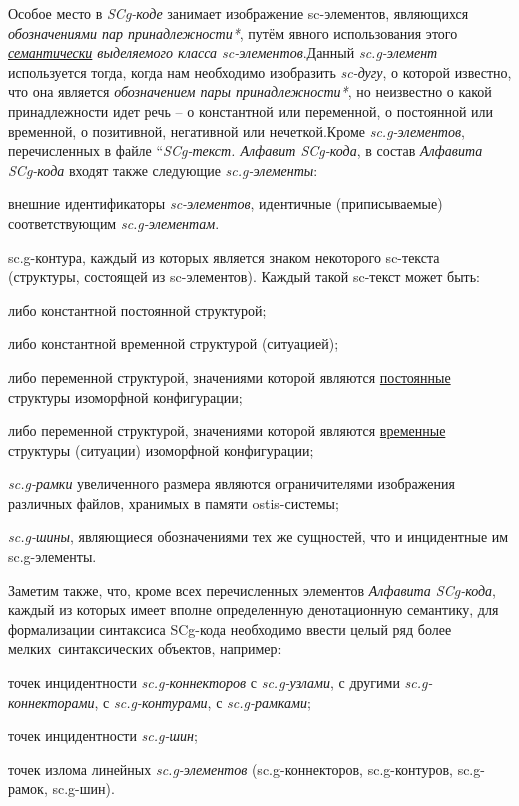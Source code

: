 \begin{SCn}
\begin{scnstruct}
\begin{scnsubstruct}
{            Особое место в \textit{SCg-коде} занимает изображение sc-элементов, являющихся \textit{обозначениями пар принадлежности*}, путём явного использования этого \textit{\uline{семантически} выделяемого класса sc-элементов}.Данный \textit{sc.g-элемент} используется тогда, когда нам необходимо изобразить \textit{sc-дугу}, о которой известно, что она является \textit{обозначением пары принадлежности*}, но неизвестно о какой принадлежности идет речь -- о константной или переменной, о постоянной или временной, о позитивной, негативной или нечеткой.Кроме\textit{ sc.g-элементов}, перечисленных в файле ``\textit{SCg-текст. Алфавит SCg-кода}, в состав \textit{Алфавита SCg-кода} входят также следующие \textit{sc.g-элементы}:\begin{scnitemize}
            \item{внешние идентификаторы \textit{sc-элементов}, идентичные (приписываемые) соответствующим \textit{sc.g-элементам}.}\item{sc.g-контура, каждый из которых является знаком некоторого sc-текста (структуры, состоящей из sc-элементов). Каждый такой sc-текст может быть:}\begin{scnitemizeii}
            \item{либо константной постоянной структурой;}\item{либо константной временной структурой (ситуацией);}\item{либо переменной структурой, значениями которой являются \uline{постоянные} структуры изоморфной  конфигурации;}\item{либо переменной структурой, значениями которой являются \uline{временные} структуры (ситуации) изоморфной  конфигурации;}\end{scnitemizeii}
            \item{\textit{sc.g-рамки} увеличенного размера являются ограничителями изображения различных файлов, хранимых в памяти ostis-системы;}\item{\textit{sc.g-шины}, являющиеся обозначениями тех же сущностей, что и инцидентные им sc.g-элементы.}\end{scnitemize}
            Заметим также, что, кроме всех перечисленных элементов \textit{Алфавита SCg-кода}, каждый из которых имеет вполне определенную денотационную  семантику, для формализации синтаксиса SCg-кода необходимо ввести целый ряд более мелких\ синтаксических объектов, например:\begin{scnitemize}
            \item{точек инцидентности \textit{sc.g-коннекторов} с \textit{sc.g-узлами}, с другими \textit{sc.g-коннекторами}, с \textit{sc.g-контурами}, с \textit{sc.g-рамками};}\item{точек инцидентности \textit{sc.g-шин};}\item{точек излома линейных \textit{sc.g-элементов} (sc.g-коннекторов, sc.g-контуров, sc.g-рамок, sc.g-шин).}\end{scnitemize}
            }
            

\end{scnsubstruct}
\end{scnstruct}
\end{SCn}
